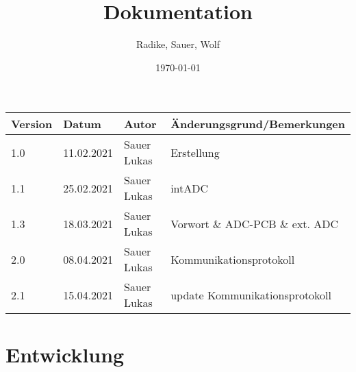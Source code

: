 \documentclass[a4paper,12pt]{article}
\begin{document}
\title{Dokumentation}
\author{Radike, Sauer, Wolf}
\date{\today}
\maketitle

\begin{tabular}[h]{l|l|l|l} %
	Version & Datum & Autor & Änderungsgrund/Bemerkungen\\
	\hline\hline
	1.0 & 11.02.2021 & Sauer Lukas & Erstellung\\
	\hline
	1.1 & 25.02.2021 & Sauer Lukas & intADC\\
	\hline
	1.3 & 18.03.2021 & Sauer Lukas &  Vorwort \& ADC-PCB \& ext. ADC\\
	\hline
	2.0 & 08.04.2021 & Sauer Lukas &  Kommunikationsprotokoll\\
	\hline
	2.1 & 15.04.2021 & Sauer Lukas &  update Kommunikationsprotokoll\\
\end{tabular}
\newpage
\tableofcontents
\newpage


\section{Entwicklung}



\end{document}
